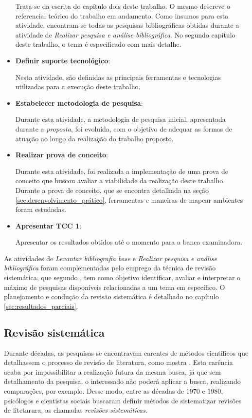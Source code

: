 \begin{itemize}
		Trata-se da escrita do capítulo dois deste trabalho. O mesmo descreve o referencial teórico do trabalho em andamento. Como insumos para esta atividade, encontram-se todas as pesquisas bibliográficas obtidas durante a atividade de \textit{Realizar pesquisa e análise bibliográfica}. No segundo capítulo deste trabalho, o tema é especificado com mais detalhe.

	\item \textbf{Definir suporte tecnológico}:

		Nesta atividade, são definidas as principais ferramentas e tecnologias utilizadas para a execução deste trabalho. 

	\item \textbf{Estabelecer metodologia de pesquisa}:

		Durante esta atividade, a metodologia de pesquisa inicial, apresentada durante a \textit{proposta}, foi evoluída, com o objetivo de adequar as formas de atuação ao longo da realização do trabalho proposto. 

	\item \textbf{Realizar prova de conceito}:

		Durante esta atividade, foi realizada a implementação de uma prova de conceito que buscou avaliar a viabilidade da realização deste trabalho. Durante a prova de conceito, que se encontra detalhada na seção \ref{sec:desenvolvimento_prático}, ferramentas e maneiras de mapear ambientes foram estudadas.

	\item \textbf{Apresentar TCC 1}:

		Apresentar os resultados obtidos até o momento para a banca examinadora.
\end{itemize}

As atividades de \textit{Levantar bibliografia base} e \textit{Realizar pesquisa e análise bibliográfica} foram complementadas pelo emprego da técnica de revisão sistemática, que segundo \cite{Kitchenham}, tem como objetivo identificar, avaliar e interpretar o máximo de pesquisas disponíveis relacionadas a um tema em específico. O planejamento e condução da revisão sistemática é detalhado no capítulo \ref{sec:resultados_parciais}.

\subsection{Revisão sistemática} %
\label{sec:revisao_sistematica}

	Durante décadas, as pesquisas se encontravam carentes de métodos científicos que detalhassem o processo de revisão de literatura, como mostra \cite{Kitchenham}. Esta carência acaba por impossibilitar a realização futura da mesma busca, já que sem detalhamento da pesquisa, o interessado não poderá aplicar a busca, realizando comparações, por exemplo. Desse modo, entre as décadas de 1970 e 1980, psicólogos e cientistas sociais buscaram definir métodos de sistematizar revisões de litetarura, as chamadas \textit{revisões sistemáticas}.  
	
